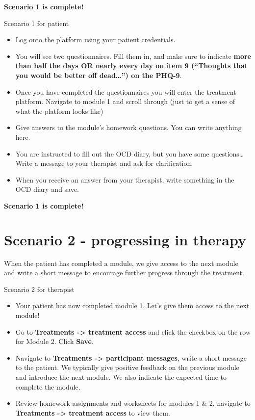 \documentclass[]{book}
\providecommand{\tightlist}{%
  \setlength{\itemsep}{0pt}\setlength{\parskip}{0pt}}
\begin{document}
\textbf{Scenario 1 is complete!}

Scenario 1 for patient

\begin{itemize}
\tightlist
\item
  Log onto the platform using your patient credentials.
\item
  You will see two questionnaires. Fill them in, and make sure to indicate \textbf{more than half the days OR nearly every day on item 9 (``Thoughts that you would be better off dead\ldots{}'') on the PHQ-9}.
\item
  Once you have completed the questionnaires you will enter the treatment platform. Navigate to module 1 and scroll through (just to get a sense of what the platform looks like)
\item
  Give answers to the module's homework questions. You can write anything here.
\item
  You are instructed to fill out the OCD diary, but you have some questions\ldots{} Write a message to your therapist and ask for clarification.
\item
  When you receive an answer from your therapist, write something in the OCD diary and save.
\end{itemize}

\textbf{Scenario 1 is complete!}

\hypertarget{scenario-2---progressing-in-therapy}{%
\section{Scenario 2 - progressing in therapy}\label{scenario-2---progressing-in-therapy}}

When the patient has completed a module, we give access to the next module and write a short message to encourage further progress through the treatment.

Scenario 2 for therapist

\begin{itemize}
\tightlist
\item
  Your patient has now completed module 1. Let's give them access to the next module!
\item
  Go to \textbf{Treatments -\textgreater{} treatment access} and click the checkbox on the row for Module 2. Click \textbf{Save}.
\item
  Navigate to \textbf{Treatments -\textgreater{} participant messages}, write a short message to the patient. We typically give positive feedback on the previous module and introduce the next module. We also indicate the expected time to complete the module.
\item
  Review homework assignments and worksheets for modules 1 \& 2, navigate to \textbf{Treatments -\textgreater{} treatment access} to view them.
\end{itemize}
\end{document}
